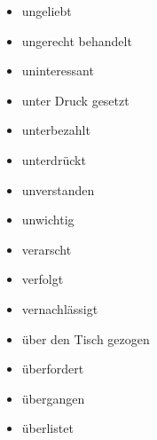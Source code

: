 \begin{multicols}{2}
\begin{itemize}
    \item ungeliebt
    \item ungerecht behandelt
    \item uninteressant
    \item unter Druck gesetzt
    \item unterbezahlt
    \item unterdrückt
    \item unverstanden
    \item unwichtig
    \item verarscht
    \item verfolgt
    \item vernachlässigt
    \item über den Tisch gezogen
    \item überfordert
    \item übergangen
    \item überlistet
  \end{itemize}
\end{multicols}
